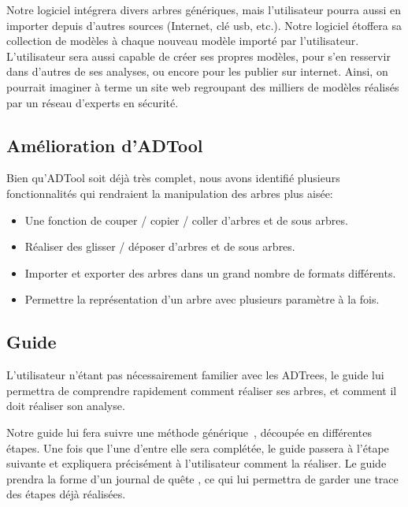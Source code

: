         Notre logiciel intégrera divers arbres génériques, mais l'utilisateur pourra aussi en importer depuis d'autres sources (Internet, clé usb, etc.). Notre logiciel étoffera sa collection de modèles à chaque nouveau modèle importé par l'utilisateur.
        L'utilisateur sera aussi capable de créer ses propres modèles, pour s'en resservir dans d'autres de ses analyses, ou encore pour les publier sur internet. Ainsi, on pourrait imaginer à terme un site web regroupant des milliers de modèles réalisés par un réseau d'experts en sécurité.

    \subsection{Amélioration d'ADTool}
        \label{sec:adtoolpp}

        Bien qu'ADTool soit déjà très complet, nous avons identifié plusieurs fonctionnalités qui rendraient la manipulation des arbres plus aisée:
        \begin{itemize}
            \item Une fonction de couper / copier / coller d'arbres et de sous arbres.
            \item Réaliser des glisser / déposer d'arbres et de sous arbres.
            \item Importer et exporter des arbres dans un grand nombre de formats différents.
            \item Permettre la représentation d'un arbre avec plusieurs paramètre à la fois.
        \end{itemize}

    \subsection{Guide}
        \label{sec:guide}

        L'utilisateur n'étant pas nécessairement familier avec les ADTrees, le guide lui permettra de comprendre rapidement comment réaliser ses arbres, et comment il doit réaliser son analyse.

        Notre guide lui fera suivre une méthode générique~\cite{methode_analyse}, découpée en différentes étapes. Une fois que l'une d'entre elle sera complétée, le guide passera à l'étape suivante et expliquera précisément à l'utilisateur comment la réaliser.
        Le guide prendra la forme d'un \og journal de quête \fg, ce qui lui permettra de garder une trace des étapes déjà réalisées.

